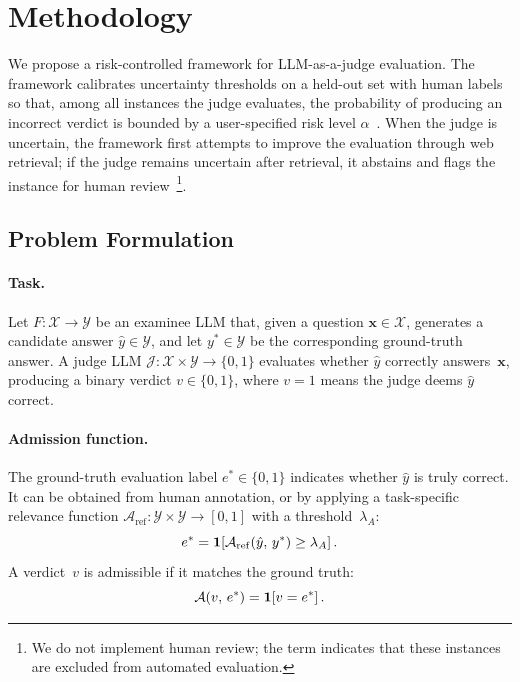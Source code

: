 \section{Methodology}
\label{sec:method}

We propose a risk-controlled framework for LLM-as-a-judge evaluation. The framework calibrates uncertainty thresholds on a held-out set with human labels so that, among all instances the judge evaluates, the probability of producing an incorrect verdict is bounded by a user-specified risk level $\alpha$~\citep{angelopoulos2023gentle, angelopoulos2024conformal}. When the judge is uncertain, the framework first attempts to improve the evaluation through web retrieval; if the judge remains uncertain after retrieval, it abstains and flags the instance for human review~\footnote{We do not implement human review; the term indicates that these instances are excluded from automated evaluation.}.

\subsection{Problem Formulation}
\label{sec:formulation}

\paragraph{Task.}
Let $F\!:\!\mathcal{X}\!\to\!\mathcal{Y}$ be an examinee LLM that, given a question $\mathbf{x} \in \mathcal{X}$, generates a candidate answer $\hat{y} \in \mathcal{Y}$, and let $y^* \in \mathcal{Y}$ be the corresponding ground-truth answer. A judge LLM $\mathcal{J}\!:\!\mathcal{X}\!\times\!\mathcal{Y}\!\to\!\{0,1\}$ evaluates whether $\hat{y}$ correctly answers~$\mathbf{x}$, producing a binary verdict $v \in \{0,1\}$, where $v\!=\!1$ means the judge deems $\hat{y}$ correct.

\paragraph{Admission function.}
The ground-truth evaluation label $e^* \in \{0,1\}$ indicates whether $\hat{y}$ is truly correct. It can be obtained from human annotation, or by applying a task-specific relevance function $\mathcal{A}_{\mathrm{ref}}\!:\!\mathcal{Y}\!\times\!\mathcal{Y}\!\to\![0,1]$ with a threshold~$\lambda_A$:
\begin{equation}
\label{eq:gt_label}
  e^* = \mathbf{1}\!\left[\mathcal{A}_{\mathrm{ref}}(\hat{y},\, y^*) \geq \lambda_A\right].
\end{equation}
A verdict~$v$ is admissible if it matches the ground truth:
\begin{equation}
\label{eq:admission}
  \mathcal{A}(v,\, e^*) = \mathbf{1}\!\left[v = e^*\right].
\end{equation}

